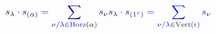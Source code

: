 \documentclass[12pt]{article}
\begin{document}
\makeatletter
\renewcommand*{\@textcolor}[3]{%
  \protect\leavevmode
  \begingroup
    \color#1{#2}#3%
  \endgroup
}
\makeatother
\begin{displaymath}
\mathcolor[RGB]{0,0,15}{s} _ { \mathcolor[RGB]{0,0,30}{\lambda} } \mathcolor[RGB]{0,0,45}{\cdot} \mathcolor[RGB]{0,0,60}{s} _ { \mathcolor[RGB]{0,0,75}{(} \mathcolor[RGB]{0,0,90}{\alpha} \mathcolor[RGB]{0,0,105}{)} } \mathcolor[RGB]{0,0,120}{=} \mathcolor[RGB]{0,0,135}{\sum} _ { \mathcolor[RGB]{0,0,150}{\nu} \mathcolor[RGB]{0,0,165}{/} \mathcolor[RGB]{0,0,180}{\lambda} \mathcolor[RGB]{0,0,195}{\in} \mathrm { \mathcolor[RGB]{0,0,210}{H} \mathcolor[RGB]{0,0,225}{o} \mathcolor[RGB]{0,0,240}{r} \mathcolor[RGB]{0,0,255}{z} \mathcolor[RGB]{0,15,0}{(} \mathcolor[RGB]{0,15,15}{\alpha} \mathcolor[RGB]{0,15,30}{)} } } \mathcolor[RGB]{0,15,45}{s} _ { \mathcolor[RGB]{0,15,60}{\nu} } \mathcolor[RGB]{0,15,75}{s} _ { \mathcolor[RGB]{0,15,90}{\lambda} } \mathcolor[RGB]{0,15,105}{\cdot} \mathcolor[RGB]{0,15,120}{s} _ { \mathcolor[RGB]{0,15,135}{(} \mathcolor[RGB]{0,15,150}{1} ^ { \mathcolor[RGB]{0,15,165}{r} } \mathcolor[RGB]{0,15,180}{)} } \mathcolor[RGB]{0,15,195}{=} \mathcolor[RGB]{0,15,210}{\sum} _ { \mathcolor[RGB]{0,15,225}{\nu} \mathcolor[RGB]{0,15,240}{/} \mathcolor[RGB]{0,15,255}{\lambda} \mathcolor[RGB]{0,30,0}{\in} \mathrm { \mathcolor[RGB]{0,30,15}{V} \mathcolor[RGB]{0,30,30}{e} \mathcolor[RGB]{0,30,45}{r} \mathcolor[RGB]{0,30,60}{t} \mathcolor[RGB]{0,30,75}{(} \mathcolor[RGB]{0,30,90}{r} \mathcolor[RGB]{0,30,105}{)} } } \mathcolor[RGB]{0,30,120}{s} _ { \mathcolor[RGB]{0,30,135}{\nu} }
\end{displaymath}
\end{document}
